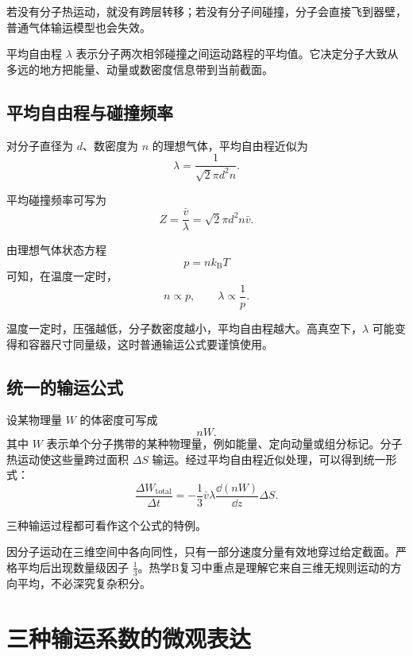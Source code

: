 若没有分子热运动，就没有跨层转移；若没有分子间碰撞，分子会直接飞到器壁，普通气体输运模型也会失效。

\begin{KeyBox}[平均自由程的作用]
平均自由程 \(\lambda\) 表示分子两次相邻碰撞之间运动路程的平均值。它决定分子大致从多远的地方把能量、动量或数密度信息带到当前截面。
\end{KeyBox}

\subsection{平均自由程与碰撞频率}

对分子直径为 \(d\)、数密度为 \(n\) 的理想气体，平均自由程近似为
\[
  \boxed{
  \lambda=\frac{1}{\sqrt{2}\pi d^2n}
  }.
\]

平均碰撞频率可写为
\[
  \boxed{
  Z=\frac{\bar v}{\lambda}
  =
  \sqrt{2}\pi d^2n\bar v
  }.
\]

由理想气体状态方程
\[
  p=nk_{\mathrm B}T
\]
可知，在温度一定时，
\[
  n\propto p,
  \qquad
  \lambda\propto \frac1p.
\]

\begin{WarnBox}[平均自由程的压强依赖]
温度一定时，压强越低，分子数密度越小，平均自由程越大。高真空下，\(\lambda\) 可能变得和容器尺寸同量级，这时普通输运公式要谨慎使用。
\end{WarnBox}

\subsection{统一的输运公式}

设某物理量 \(W\) 的体密度可写成
\[
  nW.
\]
其中 \(W\) 表示单个分子携带的某种物理量，例如能量、定向动量或组分标记。分子热运动使这些量跨过面积 \(\Delta S\) 输运。经过平均自由程近似处理，可以得到统一形式：
\[
  \boxed{
  \frac{\Delta W_{\mathrm{total}}}{\Delta t}
  =
  -\frac13\bar v\lambda
  \frac{\dd (nW)}{\dd z}
  \Delta S
  }.
\]

三种输运过程都可看作这个公式的特例。

\begin{KeyBox}
因分子运动在三维空间中各向同性，只有一部分速度分量有效地穿过给定截面。严格平均后出现数量级因子 \(\frac13\)。热学B复习中重点是理解它来自三维无规则运动的方向平均，不必深究复杂积分。
\end{KeyBox}

\section{三种输运系数的微观表达}

